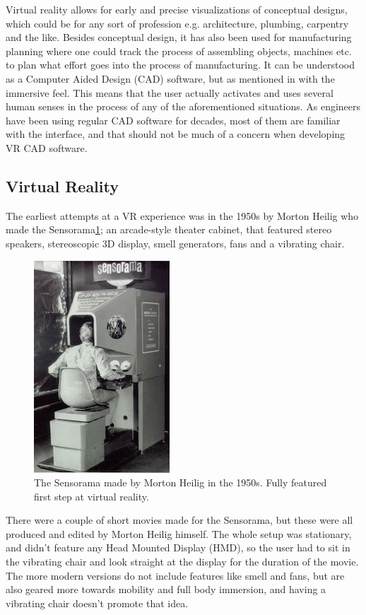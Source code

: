		Virtual reality allows for early and precise visualizations of conceptual designs, which could be for any sort of profession e.g. architecture, plumbing, carpentry and the like. Besides conceptual design, it has also been used for manufacturing planning where one could track the process of assembling objects, machines etc. to plan what effort goes into the process of manufacturing. It can be understood as a Computer Aided Design (CAD) software, but as mentioned in \cite{engineeringVR} with the immersive feel. This means that the user actually activates and uses several human senses in the process of any of the aforementioned situations. As engineers have been using regular CAD software for decades, most of them are familiar with the interface, and that should not be much of a concern when developing VR CAD software.

									
		\subsection{Virtual Reality}
		The earliest attempts at a VR experience was in the 1950s\cite{VRS} by Morton Heilig who made the Sensorama\ref{fig:sensorama}; an arcade-style theater cabinet, that featured stereo speakers, stereoscopic 3D display, smell generators, fans and a vibrating chair.
		\begin{figure}[H]
			\centering
			\includegraphics[width=0.4\linewidth]{figure/Analysis/sensorama2}
			\caption{The Sensorama made by Morton Heilig in the 1950s. Fully featured first step at virtual reality.}
			\label{fig:sensorama}
		\end{figure}
		There were a couple of short movies made for the Sensorama, but these were all produced and edited by Morton Heilig himself. The whole setup was stationary, and didn't feature any Head Mounted Display (HMD), so the user had to sit in the vibrating chair and look straight at the display for the duration of the movie. The more modern versions do not include features like smell and fans, but are also geared more towards mobility and full body immersion, and having a vibrating chair doesn't promote that idea.\\
		
